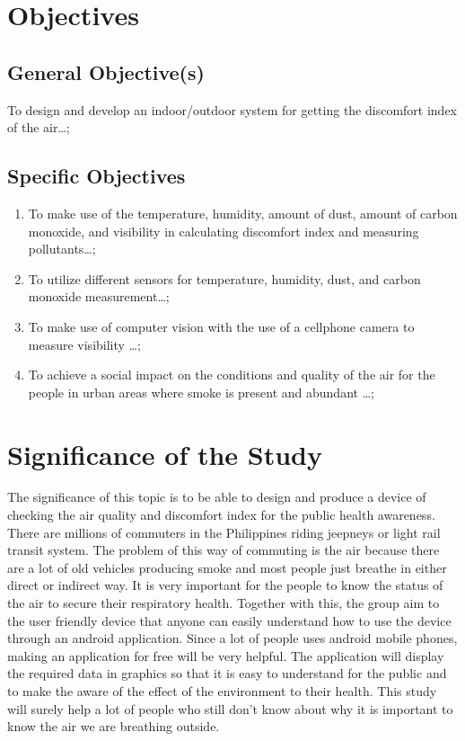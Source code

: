 \section{Objectives}
\subsection{General Objective(s)}
To design and develop an indoor/outdoor system for getting the discomfort index of the air\ldots;

\subsection{Specific Objectives}

\begin{enumerate}

	\item To make use of the temperature, humidity, amount of dust, amount of carbon monoxide, and visibility in calculating discomfort index and measuring pollutants\ldots;

	\item To utilize different sensors for temperature, humidity, dust, and carbon monoxide measurement\ldots;
	
	\item To make use of computer vision with the use of a cellphone camera to measure visibility \ldots;
	
	\item To achieve a social impact on the conditions and quality of the air for the people in urban areas where smoke is present and abundant \ldots;
	
\end{enumerate}



\section{Significance of the Study}

The significance of this topic is to be able to design and produce a device of checking the air quality and discomfort index for the public health awareness. There are millions of commuters in the Philippines riding jeepneys or light rail transit system. The problem of this way of commuting is the air because there are a lot of old vehicles producing smoke and most people just breathe in either direct or indirect way. It is very important for the people to know the status of the air to secure their respiratory health. Together with this, the group aim to the user friendly device that anyone can easily understand how to use the device through an android application. Since a lot of people uses android mobile phones, making an application for free will be very helpful. The application will display the required data in graphics so that it is easy to understand for the public and to make the aware of the effect of the environment to their health. This study will surely help a lot of people who still don’t know about why it is important to know the air we are breathing outside.


